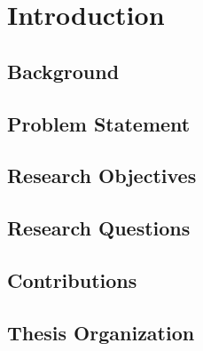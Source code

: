 \chapter{Introduction} \label{chap:intro}

\section{Background}

\section{Problem Statement}

\section{Research Objectives}

\section{Research Questions}

\section{Contributions}

\section{Thesis Organization}
